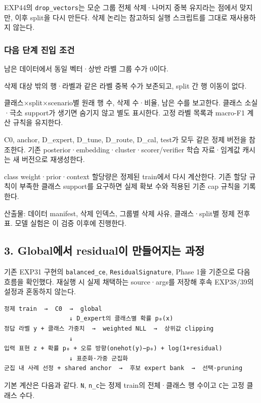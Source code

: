 \par\noindent \textbullet\enspace EXP44의 \texttt{drop\_\allowbreak{}\allowbreak{}vec\allowbreak{}tors}는 모순 그룹 전체 삭제·나머지 중복 유지라는 점에서 맞지만, 이후 split을 다시 만든다. 삭제 논리는 참고하되 실행 스크립트를 그대로 재사용하지 않는다.


\subsubsection{다음 단계 진입 조건}
\par\noindent \textbullet\enspace 남은 데이터에서 동일 벡터·상반 라벨 그룹 수가 0이다.


\par\noindent \textbullet\enspace 삭제 대상 밖의 행·라벨과 같은 라벨 중복 수가 보존되고, split 간 행 이동이 없다.


\par\noindent \textbullet\enspace 클래스×split×scenario별 원래 행 수, 삭제 수·비율, 남은 수를 보고한다. 클래스 소실·극소 support가 생기면 숨기지 않고 별도 표시한다. 고정 라벨 목록과 macro-F1 계산 규칙을 유지한다.


\par\noindent \textbullet\enspace C0, anchor, D\_\allowbreak{}expert, D\_\allowbreak{}tune, D\_\allowbreak{}route, D\_\allowbreak{}cal, test가 모두 같은 정제 버전을 참조한다. 기존 posterior·embedding·cluster·scorer/\allowbreak{}verifier 학습 자료·임계값 캐시는 새 버전으로 재생성한다.


\par\noindent \textbullet\enspace class weight·prior·context 할당량은 정제된 train에서 다시 계산한다. 기존 할당 규칙이 부족한 클래스 support를 요구하면 실제 확보 수와 적용된 기존 cap 규칙을 기록한다.


산출물: 데이터 manifest, 삭제 인덱스, 그룹별 삭제 사유, 클래스·split별 정제 전후 표. 모델 실험은 이 검증 이후에 진행한다.

\subsection{3. Global에서 residual이 만들어지는 과정}
기존 EXP31 구현의 \texttt{balanced\allowbreak{}\_\allowbreak{}\allowbreak{}ce}, \texttt{Residual\allowbreak{}Signatur\allowbreak{}e}, Phase 1을 기준으로 다음 흐름을 확인했다. 재실행 시 실제 채택하는 source·args를 저장해 후속 EXP38/\allowbreak{}39의 설정과 혼동하지 않는다.


\begin{Verbatim}[breaklines=true,breakanywhere=true,fontsize=\scriptsize]
정제 train  →  C0  →  global
                  ↓ D_expert의 클래스별 확률 p₀(x)
정답 라벨 y + 클래스 가중치  →  weighted NLL  →  상위값 clipping
                  ↓
입력 표현 z + 확률 p₀ + 오류 방향(onehot(y)−p₀) + log(1+residual)
                  ↓ 표준화·가중 군집화
군집 내 사례 선정 + shared anchor  →  후보 expert bank  →  선택·pruning

\end{Verbatim}
기본 계산은 다음과 같다. \texttt{N}, \texttt{n\_\allowbreak{}\allowbreak{}c}는 정제 train의 전체·클래스 행 수이고 \texttt{C}는 고정 클래스 수다.


